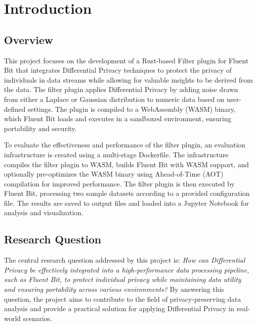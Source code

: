 \chapter{Introduction\label{chap:introduction}}
\section{Overview}

This project focuses on the development of a Rust-based Filter plugin for Fluent Bit that integrates Differential Privacy techniques to protect the privacy of individuals in data streams while allowing for valuable insights to be derived from the data. The filter plugin applies Differential Privacy by adding noise drawn from either a Laplace or Gaussian distribution to numeric data based on user-defined settings. The plugin is compiled to a WebAssembly (WASM) binary, which Fluent Bit loads and executes in a sandboxed environment, ensuring portability and security.

To evaluate the effectiveness and performance of the filter plugin, an evaluation infrastructure is created using a multi-stage Dockerfile. The infrastructure compiles the filter plugin to WASM, builds Fluent Bit with WASM support, and optionally pre-optimizes the WASM binary using Ahead-of-Time (AOT) compilation for improved performance. The filter plugin is then executed by Fluent Bit, processing two sample datasets according to a provided configuration file. The results are saved to output files and loaded into a Jupyter Notebook for analysis and visualization.

\section{Research Question}
The central research question addressed by this project is:
\textit{How can Differential Privacy be effectively integrated into a high-performance data processing pipeline, such as Fluent Bit, to protect individual privacy while maintaining data utility and ensuring portability across various environments?}
By answering this question, the project aims to contribute to the field of privacy-preserving data analysis and provide a practical solution for applying Differential Privacy in real-world scenarios.
